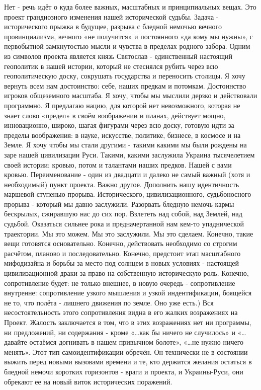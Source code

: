 \obeycr
Нет - речь идёт о куда более важных, масштабных и принципиальных вещах.
Это проект грандиозного изменения нашей исторической судьбы.
Задача - исторического прыжка в будущее, разрыва с бледной немочью вечного провинциализма, вечного «не получится» и постоянного «да кому мы нужны», с первобытной замкнутостью мысли и чувства в пределах родного забора. 
Одним из символов проекта является князь Святослав - единственный настоящий геополитик в нашей истории, который не стеснялся рубить через всю геополитическую доску, сокрушать государства и переносить столицы.
Я хочу вернуть всем нам достоинство: себе, наших предкам и потомкам.
Достоинство игроков общеземного масштаба. 
Я хочу, чтобы мы мыслили дерзко и действовали программно.
Я предлагаю нацию, для которой нет невозможного, которая не знает слово «предел» в своём воображении и планах, действует мощно,  инновационно, широко, шагая фигурами через всю доску, готовую идти за пределы воображения: в науке, искусстве, политике, бизнесе, в космосе и на Земле.
Я хочу чтобы мы стали другими - такими какими мы были рождены на заре нашей цивилизации Руси. 
Такими, какими заслужила Украина тысячелетием своей истории: кровью, потом и талантами наших предков. Нашей с вами кровью. 
Переименование - один из двадцати и  далеко не самый важный (хотя и необходимый) пункт проекта. 
Важно другое.
Дополнить нашу идентичность маршевой ступенью прорыва.
Исторического, цивилизационного,  судьбоносного прорыва - который мы давно заслужили.
Разорвать бледную немочь кармы бескрылых, сжиравшую нас до сих пор.
Взлететь над собой, над Землей, над судьбой.
Оказаться сильнее рока и предначертанной нам кем-то упаднической траектории. 
Мы это можем. Мы это заслужили. Мы это сделаем.
Конечно, такие вещи готовятся основательно.
Конечно, действовать необходимо со строгим расчётом, планово и последовательно. 
Конечно, предстоит этап масштабного мифодизайна и борьбы за место под солнцем в новых условиях - настоящей цивилизационной драки за право на собственную историческую роль. 
Конечно, сопротивление будет: не только внешнее, в новую очередь - сопротивление внутренне: сопротивление узкого мышления и узкой индентификации, боящейся не то, что полёта - лишнего движения по земле. 
Оно уже есть.)
Вся несостоятельность этого сопротивления видна в его жалких возражениях на Проект.
Жалость заключается в том, что в этих возражениях нет ни программы, ни предложений, ни содержания - кроме «…как бы ничего не случилось» и «…давайте остаёмся догнивать в нашем привычном болоте», «…не нужно ничего менять». 
Этот тип самоидентификации обречён. 
Он технически не в состоянии выжить перед новыми вызовами времени и те, кто держится желания остаться в бледной немочи коротких горизонтов - враги и проекта, и Украины-Руси, они обрекают ее на новый виток исторических поражений. 
